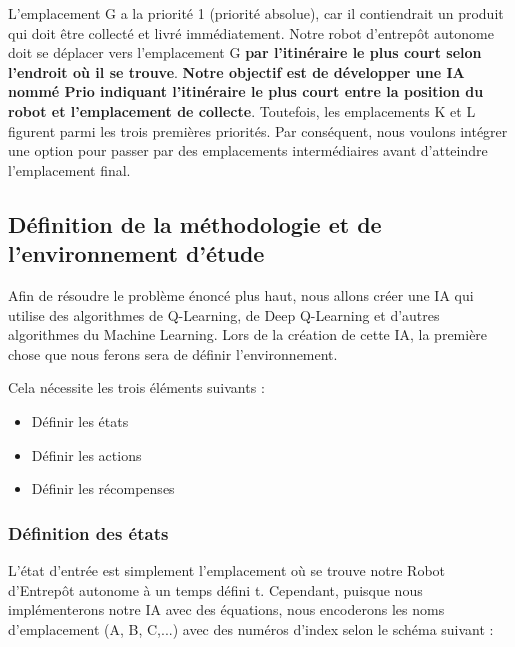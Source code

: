 \documentclass{article}
\begin{document}
L'emplacement G a la priorité 1 (priorité absolue), car il contiendrait un produit qui doit être collecté et livré immédiatement. Notre robot d'entrepôt autonome doit se déplacer vers l'emplacement G \textbf{par l'itinéraire le plus court selon l'endroit où il se trouve}. \textbf{Notre objectif est de développer une IA nommé Prio  indiquant l'itinéraire le plus court entre la position du robot et l’emplacement de collecte}. Toutefois, les emplacements K et L figurent parmi les trois premières priorités. Par conséquent, nous voulons intégrer une option pour passer par des emplacements intermédiaires avant d'atteindre l'emplacement final.

\subsection{Définition de la méthodologie et de l'environnement d'étude}
Afin de résoudre le problème énoncé plus haut, nous allons créer une IA qui utilise des algorithmes de Q-Learning, de Deep Q-Learning et d'autres algorithmes du Machine Learning. Lors de la création de cette IA, la première chose que nous ferons sera de définir l'environnement.

Cela nécessite les trois éléments suivants :
\begin{itemize}
    \item Définir les états
    \item Définir les actions
    \item Définir les récompenses
\end{itemize}

\subsubsection{Définition des états}
L'état d'entrée est simplement l'emplacement où se trouve notre Robot d'Entrepôt autonome à un temps défini t. Cependant, puisque nous implémenterons notre IA avec des équations, nous encoderons les noms d'emplacement (A, B, C,...) avec des numéros d'index selon le schéma suivant :
\end{document}
